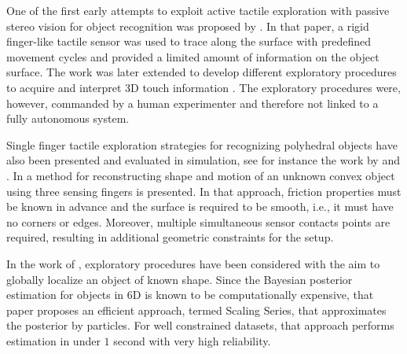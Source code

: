 
One of the first early attempts to exploit active tactile exploration with passive stereo vision for object recognition was proposed by \citet{Allen1987Robotic}. In that paper, a rigid finger-like tactile sensor was used to trace along the surface with predefined movement cycles and provided a limited amount of information on the object surface. The work was later extended to develop different exploratory procedures to acquire and interpret 3D touch information \citet{Allen1990Acquisition}. The exploratory procedures were, however, commanded by a human experimenter and therefore not linked to a fully autonomous system.

Single finger tactile exploration strategies for recognizing polyhedral objects have also been presented and evaluated in simulation, see for instance the work by \citet{Roberts1990ICRA} and \citet{Caselli1996ICRA}. In \citet{Moll2003STAR} a method for reconstructing shape and motion of an unknown convex object using three sensing fingers is presented. In that approach, friction properties must be known in advance and the surface is required to be smooth, i.e., it must have no corners or edges. Moreover, multiple simultaneous sensor contacts points are required, resulting in additional geometric constraints for the setup.


In the work of \citet{Petrovskaya2011Global}, exploratory procedures have been considered with the aim to globally localize an object of known shape. Since the Bayesian posterior estimation for objects in 6D is known to be computationally expensive, that paper proposes an efficient approach, termed Scaling Series, that approximates the posterior by particles. For well constrained datasets, that approach performs estimation in under $1$ second with very high reliability.

